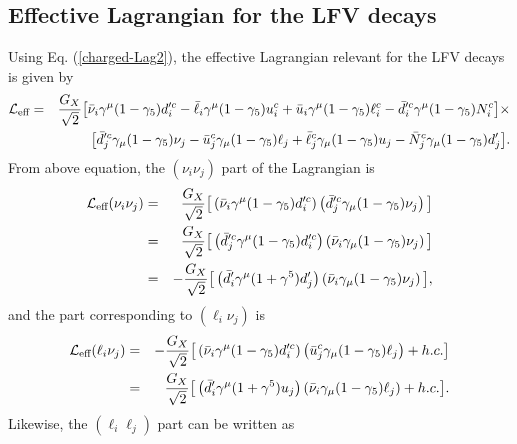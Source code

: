 \documentclass{ws-ijmpa}
\begin{document}
\subsection{Effective Lagrangian for the LFV decays}

Using Eq. (\ref{charged-Lag2}), the effective Lagrangian relevant for the LFV decays is given by
\begin{eqnarray}
\mathcal{L}_{\text{eff}} &=& \frac{G_X}{\sqrt{2}}\big[\bar{\nu}_{i}\gamma^{\mu}(1-\gamma_5)d^{\prime c}_i - \bar{\ell}_{i}\gamma^{\mu}(1-\gamma_5)u^{c}_i + \bar{u}_{i}\gamma^{\mu}(1-\gamma_5)\ell^{c}_i - \bar{d}^{\prime c}_{i}\gamma^{\mu}(1-\gamma_5)N^{c}_i\big]\times\notag \\
&& \big[\bar{d}^{\prime c}_{j}\gamma_{\mu}(1-\gamma_5)\nu_{j} - \bar{u}^{c}_{j}\gamma_{\mu}(1-\gamma_5)\ell_{j} + \bar{\ell}^{c}_{j}\gamma_{\mu}(1-\gamma_5)u_{j} - \bar{N}^{c}_{j}\gamma_{\mu}(1-\gamma_5)d^{\prime}_{j}\big] \label{Lag-charged}.
\end{eqnarray}
From above equation, the $(\nu_{i}\nu_{j})$ part of the Lagrangian is
\begin{eqnarray}
\mathcal{L}_{\text{eff}}(\nu_{i}\nu_{j}) &=&  \frac{G_X}{\sqrt{2}}\big[\left(\bar{\nu}_{i}\gamma^{\mu}(1-\gamma_5)d^{\prime c}_i\right)\left(\bar{d}^{\prime c}_{j}\gamma_{\mu}(1-\gamma_5)\nu_{j}\right)\big]\notag \\
& = & \frac{G_X}{\sqrt{2}}\big[\left(\bar{d}^{\prime c}_{j}\gamma^{\mu}(1-\gamma_5)d^{\prime c}_i\right)\left(\bar{\nu}_{i}\gamma_{\mu}(1-\gamma_5)\nu_{j}\right)\big]\notag\\
&=&-\frac{G_X}{\sqrt{2}}\big[\left(\bar{d}^{\prime}_{i}\gamma^{\mu}(1+\gamma^5)d^{\prime}_j\right)\left(\bar{\nu}_{i}\gamma_{\mu}(1-\gamma_5)\nu_{j}\right)\big]\label{neutrino-Lag},
\end{eqnarray}
and the part corresponding to $(\ell_{i} \nu_{j})$ is
\begin{eqnarray}
\mathcal{L}_{\text{eff}}(\ell_{i}\nu_{j}) &=&  -\frac{G_X}{\sqrt{2}}\big[\left(\bar{\nu}_{i}\gamma^{\mu}(1-\gamma_5)d^{\prime c}_i\right)\left(\bar{u}^{c}_{j}\gamma_{\mu}(1-\gamma_5)\ell_{j}\right)+h.c.\big]\notag \\
& = & \frac{G_X}{\sqrt{2}}\big[\left(\bar{d}^{\prime}_{i}\gamma^{\mu}(1+\gamma^5)u_{j}\right)\left(\bar{\nu}_{i}\gamma_{\mu}(1-\gamma_5)\ell_{j}\right) + h.c.\big]\label{lnu-Lag}.
\end{eqnarray}
Likewise, the $(\ell_{i} \ell_{j})$ part can be written as
\end{document}
